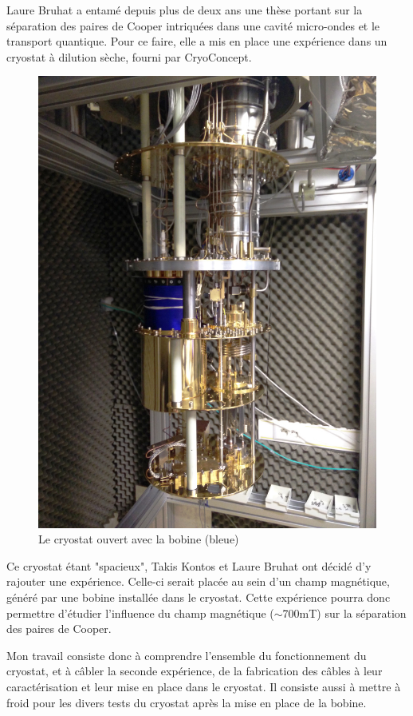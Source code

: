 
Laure Bruhat a entamé depuis plus de deux ans une thèse portant sur la séparation des paires de Cooper intriquées dans une cavité micro-ondes et le transport quantique. Pour ce faire, elle a mis en place une expérience dans un cryostat à dilution sèche, fourni par CryoConcept.
\par
\begin{figure}[h]
    \begin{center}
        \includegraphics[height=0.7\textwidth]{Images/Global.jpg}
        \caption{Le cryostat ouvert avec la bobine (bleue)}
        \label{photo_separateur_nanotube}
    \end{center}
\end{figure}


Ce cryostat étant "spacieux", Takis Kontos et Laure Bruhat ont décidé d'y rajouter une expérience. Celle-ci serait placée au sein d'un champ magnétique, généré par une bobine installée dans le cryostat. Cette expérience pourra donc permettre d'étudier l'influence du champ magnétique ($\sim$700mT) sur la séparation des paires de Cooper.\newline

Mon travail consiste donc à comprendre l'ensemble du fonctionnement du cryostat, et à câbler la seconde expérience, de la fabrication des câbles à leur caractérisation et leur mise en place dans le cryostat. Il consiste aussi à mettre à froid pour les divers tests du cryostat après la mise en place de la bobine.
